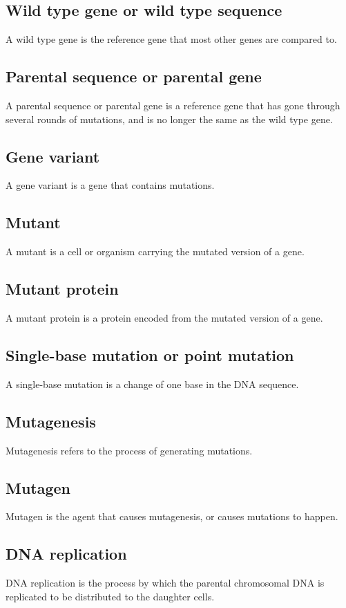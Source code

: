 \documentclass[11pt]{article}
\begin{document}
\subsection{Wild type gene or wild type sequence}
\label{sec:org6fce91b}
A wild type gene is the reference gene that most other genes are compared to.
\subsection{Parental sequence or parental gene}
\label{sec:orgc1c24fb}
A parental sequence or parental gene is a reference gene that has gone through several rounds of mutations, and is no longer the same as the wild type gene.
\subsection{Gene variant}
\label{sec:org35666a6}
A gene variant is a gene that contains mutations.
\subsection{Mutant}
\label{sec:org0cf9f93}
A mutant is a cell or organism carrying the mutated version of a gene.
\subsection{Mutant protein}
\label{sec:org3edc947}
A mutant protein is a protein encoded from the mutated version of a gene.
\subsection{Single-base mutation or point mutation}
\label{sec:orgcac41e3}
A single-base mutation is a change of one base in the DNA sequence.
\subsection{Mutagenesis}
\label{sec:org0bdd31d}
Mutagenesis refers to the process of generating mutations.
\subsection{Mutagen}
\label{sec:org2f6e73b}
Mutagen is the agent that causes mutagenesis, or causes mutations to happen.
\subsection{DNA replication}
\label{sec:org77e0521}
DNA replication is the process by which the parental chromosomal DNA is replicated to be distributed to the daughter cells.
\end{document}
